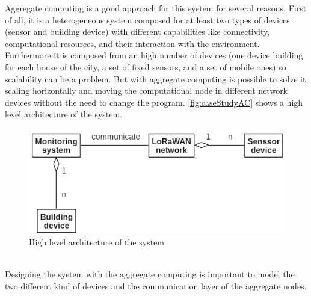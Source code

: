Aggregate computing is a good approach for this system for several reasons.
First of all, it is a heterogeneous system composed for at least two types of devices (sensor and building device) with different capabilities like connectivity, computational resources, and their interaction with the environment. 
Furthermore it is composed from an high number of devices (one device building for each house of the city, a set of fixed sensors, and a set of mobile ones) so scalability can be a problem. But with aggregate computing is possible to solve it scaling horizontally and moving the computational node in different network devices without the need to change the program.
\autoref{fig:caseStudyAC} shows a high level architecture of the system.
\begin{figure}[h]
    \centering
    \includegraphics{figures/caseStudyB_high.png}
    \caption[High level architecture of the system (case study 2)]{High level architecture of the system}
    \label{fig:caseStudyAC}
\end{figure}
\\Designing the system with the aggregate computing is important to model the two different kind of devices and the communication layer of the aggregate nodes.

